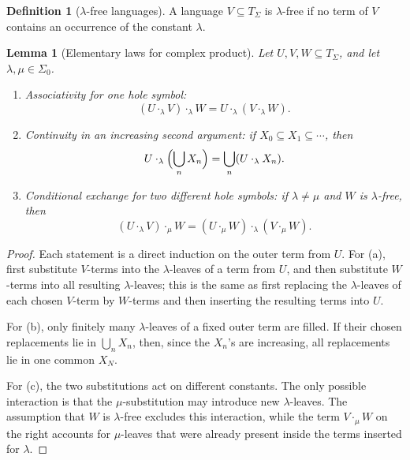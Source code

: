 \documentclass[11pt]{article}
\newtheorem{lemma}[theorem]{Lemma}
\theoremstyle{definition}
\newtheorem{definition}[theorem]{Definition}
\newcommand{\SigmaSym}{\Sigma}
\newcommand{\Term}[1]{T_{#1}}
\begin{document}
\begin{definition}[\(\lambda\)-free languages]
A language \(V\subseteq\Term{\SigmaSym}\) is \(\lambda\)-free if no term of
\(V\) contains an occurrence of the constant \(\lambda\).
\end{definition}

\begin{lemma}[Elementary laws for complex product]\label{lem:complex-product-laws}
Let \(U,V,W\subseteq\Term{\SigmaSym}\), and let
\(\lambda,\mu\in\SigmaSym_0\).
\begin{enumerate}[label=\textup{(\alph*)},leftmargin=*]
  \item Associativity for one hole symbol:
  \[
    (U\cdot_\lambda V)\cdot_\lambda W
    =
    U\cdot_\lambda(V\cdot_\lambda W).
  \]
  \item Continuity in an increasing second argument: if
  \(X_0\subseteq X_1\subseteq\cdots\), then
  \[
    U\cdot_\lambda\Bigl(\bigcup_n X_n\Bigr)
    =
    \bigcup_n(U\cdot_\lambda X_n).
  \]
  \item Conditional exchange for two different hole symbols: if
  \(\lambda\ne\mu\) and \(W\) is \(\lambda\)-free, then
  \[
    (U\cdot_\lambda V)\cdot_\mu W
    =
    (U\cdot_\mu W)\cdot_\lambda(V\cdot_\mu W).
  \]
\end{enumerate}
\end{lemma}

\begin{proof}
Each statement is a direct induction on the outer term from \(U\).  For (a),
first substitute \(V\)-terms into the \(\lambda\)-leaves of a term from \(U\),
and then substitute \(W\)-terms into all resulting \(\lambda\)-leaves; this is
the same as first replacing the \(\lambda\)-leaves of each chosen \(V\)-term by
\(W\)-terms and then inserting the resulting terms into \(U\).

For (b), only finitely many \(\lambda\)-leaves of a fixed outer term are filled.
If their chosen replacements lie in \(\bigcup_n X_n\), then, since the
\(X_n\)'s are increasing, all replacements lie in one common \(X_N\).

For (c), the two substitutions act on different constants.  The only possible
interaction is that the \(\mu\)-substitution may introduce new
\(\lambda\)-leaves.  The assumption that \(W\) is \(\lambda\)-free excludes this
interaction, while the term \(V\cdot_\mu W\) on the right accounts for
\(\mu\)-leaves that were already present inside the terms inserted for
\(\lambda\).
\end{proof}
\end{document}
